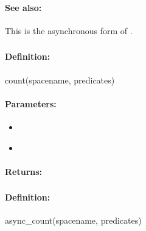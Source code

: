 \paragraph{See also:}  This is the asynchronous form of .

\pagebreak
\subsubsection{}
\label{api:ruby:count}


\paragraph{Definition:}
\begin{rubycode}
count(spacename, predicates)
\end{rubycode}

\paragraph{Parameters:}
\begin{itemize}[noitemsep]
\item {}\\

\item {}\\

\end{itemize}

\paragraph{Returns:}


\pagebreak
\subsubsection{}
\label{api:ruby:async_count}


\paragraph{Definition:}
\begin{rubycode}
async_count(spacename, predicates)
\end{rubycode}


